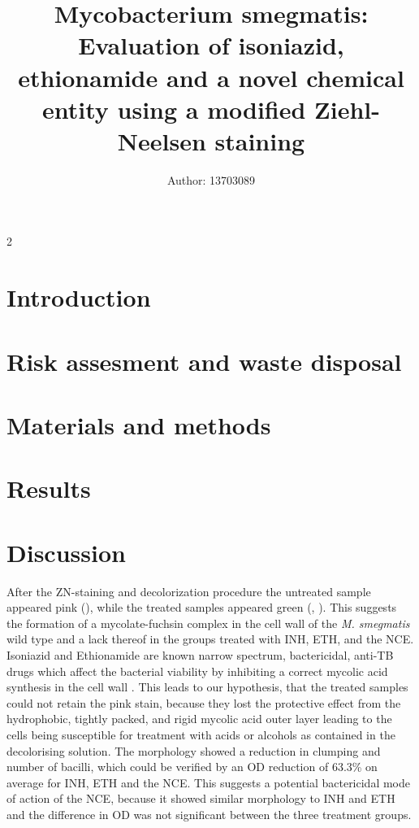 \documentclass[11pt]{cls/labreport}
\title{\vspace*{2cm} Mycobacterium smegmatis: Evaluation of isoniazid, ethionamide and a novel chemical entity using a modified Ziehl-Neelsen staining}
\author[1]{Author: 13703089}
\affil[1]{BSc Biomedicine$^{\ast}$}
\begin{document}
\maketitle
\thispagestyle{firststyle}
\vspace{-13pt}%

\begin{multicols}{2}
\begin{abstract}
    \abstract
\end{abstract}
\section{Introduction}
    \introduction
    
\section{Risk assesment and waste disposal}
    \riskassesment
    
\section{Materials and methods}
\label{sec:materials:methods}
    \materials

\section{Results}
    \results


\section{Discussion}
After the ZN-staining and decolorization procedure the untreated sample appeared pink (), while the treated samples appeared green (, ). This suggests the formation of a mycolate-fuchsin complex in the cell wall of the \textit{M. smegmatis} wild type and a lack thereof in the groups treated with INH, ETH, and the NCE. Isoniazid and Ethionamide are known narrow spectrum, bactericidal, anti-TB drugs which affect the bacterial viability by inhibiting a correct mycolic acid synthesis in the cell wall \cite{Banerjee1994,York2008}. This leads to our hypothesis, that the treated samples could not retain the pink stain, because they lost the protective effect from the hydrophobic, tightly packed, and rigid mycolic acid outer layer leading to the cells being susceptible for treatment with acids or alcohols as contained in the decolorising solution. The morphology showed a reduction in clumping and number of bacilli, which could be verified by an OD reduction of 63.3\% on average for INH, ETH and the NCE.  This suggests a potential bactericidal mode of action of the NCE, because it showed similar morphology to INH and ETH and the difference in OD was not significant between the three treatment groups.


\end{multicols}
\end{document}
